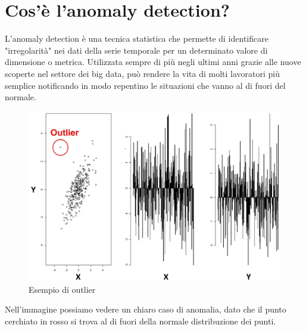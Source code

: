 \section{Cos'è l'anomaly detection?}
L'anomaly detection è una tecnica statistica che permette di identificare "irregolarità" nei dati della serie temporale per un determinato valore di dimensione o metrica. 
Utilizzata sempre di più negli ultimi anni grazie alle nuove scoperte nel settore dei big data, può rendere la vita di molti lavoratori più semplice notificando in modo repentino le situazioni che vanno al di fuori del normale.
\newpage
\begin{figure}[h!]
	\centering
	\includegraphics[scale=0.1]{figures/anomaly_detection_example}
	\caption[Esempio lavagna Kanban.]{Esempio di outlier \cite{anomalydetection}
		\label{fig:logoGCP}}
\end{figure}	

Nell'immagine possiamo vedere un chiaro caso di anomalia, dato che il punto cerchiato in rosso si trova al di fuori della normale distribuzione dei punti.